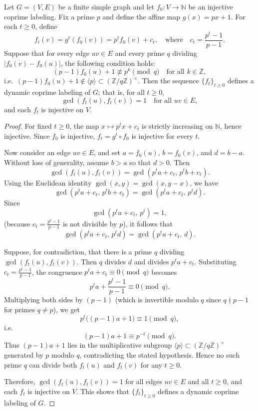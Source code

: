 \documentclass[10pt,a4paper]{amsart}
\begin{document}
\begin{thm}\label{thm:alternate-map}
Let $G = (V,E)$ be a finite simple graph and let $f_0 : V \to \mathbb{N}$ be an injective coprime labeling. Fix a prime $p$ and define the affine map $g(x) = p x + 1$. For each $t \ge 0$, define
\[
f_t(v) = g^t(f_0(v)) = p^t f_0(v) + c_t, \quad \text{where} \quad c_t = \frac{p^t - 1}{p - 1}.
\]
Suppose that for every edge $uv \in E$ and every prime $q$ dividing $|f_0(v) - f_0(u)|$, the following condition holds:
\[
(p - 1)f_0(u) + 1 \not\equiv p^k \pmod{q}\quad \text{for all }k\in\mathbb{Z},
\]
i.e.\ $(p - 1)f_0(u) + 1 \notin \langle p \rangle \subset (\mathbb{Z}/q\mathbb{Z})^\times$. Then the sequence $\{f_t\}_{t \ge 0}$ defines a dynamic coprime labeling of $G$; that is, for all $t \ge 0$,
\[
\gcd(f_t(u), f_t(v)) = 1 \quad \text{for all } uv \in E,
\]
and each $f_t$ is injective on $V$.
\end{thm}

\begin{proof}
For fixed $t\ge0$, the map $x \mapsto p^t x + c_t$ is strictly increasing on $\mathbb{N}$, hence injective. Since $f_0$ is injective, $f_t = g^t \circ f_0$ is injective for every $t$.

Now consider an edge $uv \in E$, and set $a = f_0(u)$, $b = f_0(v)$, and $d = b - a$. Without loss of generality, assume $b > a$ so that $d > 0$. Then
\[
\gcd(f_t(u), f_t(v)) = \gcd(p^t a + c_t,\, p^t b + c_t).
\]
Using the Euclidean identity $\gcd(x, y) = \gcd(x, y - x)$, we have
\[
\gcd(p^t a + c_t,\, p^t b + c_t) = \gcd(p^t a + c_t,\, p^t d).
\]
Since
\[
\gcd(p^t a + c_t,\, p^t) = 1,
\]
(because $c_t=\frac{p^t-1}{p-1}$ is not divisible by $p$), it follows that
\[
\gcd(p^t a + c_t,\, p^t d) = \gcd(p^t a + c_t,\, d).
\]

Suppose, for contradiction, that there is a prime $q$ dividing $\gcd(f_t(u),f_t(v))$. Then $q$ divides $d$ and divides $p^t a + c_t$. Substituting $c_t = \frac{p^t - 1}{p - 1}$, the congruence $p^t a + c_t \equiv 0 \pmod{q}$ becomes
\[
p^t a + \frac{p^t - 1}{p - 1} \equiv 0 \pmod{q}.
\]
Multiplying both sides by $(p - 1)$ (which is invertible modulo $q$ since $q\nmid p-1$ for primes $q\neq p$), we get
\[
p^t\bigl((p - 1)a + 1\bigr) \equiv 1 \pmod{q},
\]
i.e.
\[
(p - 1)a + 1 \equiv p^{-t} \pmod{q}.
\]
Thus $(p-1)a+1$ lies in the multiplicative subgroup $\langle p\rangle\subset(\mathbb{Z}/q\mathbb{Z})^\times$ generated by $p$ modulo $q$, contradicting the stated hypothesis. Hence no such prime $q$ can divide both $f_t(u)$ and $f_t(v)$ for any $t\ge0$.

Therefore, $\gcd(f_t(u),f_t(v)) = 1$ for all edges $uv \in E$ and all $t \ge 0$, and each $f_t$ is injective on $V$. This shows that $\{f_t\}_{t \ge 0}$ defines a dynamic coprime labeling of $G$.
\end{proof}
\end{document}
